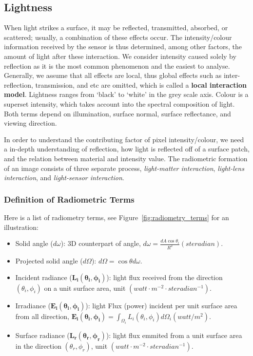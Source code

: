 \subsection{Lightness}
When light strikes a surface, it may be reflected, transmitted, absorbed, or scattered; usually, a combination of these effects occur. The intensity/colour information received by the sensor is thus determined, among other factors, the amount of light after these interaction. We consider intensity caused solely by reflection as it is the most common phenomenon and the easiest to analyse. Generally, we assume that all effects are local, thus global effects such as inter-reflection, transmission, and etc are omitted, which is called a \textbf{local interaction model}. Lightness ranges from `black' to `white' in the grey scale axis. Colour is a superset intensity, which takes account into the spectral composition of light. Both terms depend on illumination, surface normal, surface reflectance, and viewing direction.

In order to understand the contributing factor of pixel intensity/colour, we need a in-depth understanding of reflection, \ie how light is reflected off of a surface patch, and the relation between material and intensity value. The radiometric formation of an image consists of three separate process, \textit{light-matter interaction}, \textit{light-lens interaction}, and \textit{light-sensor interaction}.

\subsubsection{Definition of Radiometric Terms}
Here is a list of radiometry terms, see Figure~\ref{fig:radiometry_terms} for an illustration:
\begin{itemize}
\item Solid angle ($d\omega$): 3D counterpart of angle, $d\omega=\frac{dA \cos\theta_i}{R^2}\mathit{ (steradian)}$.
\item Projected solid angle ($d\Omega$): $d\Omega = \cos\theta d\omega$.
\item Incident radiance ($\mathbf{L_i(\theta_i, \phi_i)}$): light flux received from the direction $(\theta_i, \phi_i)$ on a unit surface area, unit $\mathit{ (watt\cdot m^{-2}\cdot steradian^{-1})}$.
\item Irradiance ($\mathbf{E_i(\theta_i, \phi_i)}$): light Flux (power) incident per unit surface area from all direction, $\mathbf{E_i(\theta_i, \phi_i)}=\int_{\Omega_i} L_i(\theta_i, \phi_i) d\Omega_i \mathit{ (watt/m^2)}$.
\item Surface radiance ($\mathbf{L_r(\theta_r, \phi_r)}$): light flux emmited from a unit surface area in the direction $(\theta_r, \phi_r)$, unit $\mathit{ (watt\cdot m^{-2}\cdot steradian^{-1})}$.
\end{itemize}

